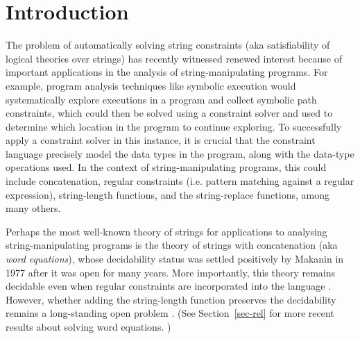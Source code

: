 
\section{Introduction}
\label{sec:intro}

The problem of %
automatically solving string constraints (aka satisfiability of logical theories over
strings) has recently witnessed renewed interest %
\cite{Berkeley-JavaScript,TCJ16,LB16,YABI14,S3,Abdulla14,Abdulla17,DV13,symbolic-transducer,BEK} 
because of important applications in the analysis of string-manipulating programs. For example,
program analysis techniques like symbolic execution \cite{king76,DART,EXE} 
would
systematically explore executions in a program and collect symbolic path 
constraints, which could then be solved using a constraint solver and
used to determine which location in the program to continue exploring.
To successfully apply a constraint solver in this instance, it is
crucial that the constraint language precisely model the data types in the
program, along with the data-type operations used. In the context of
string-manipulating programs, this could include 
concatenation, regular constraints (i.e. pattern matching against a regular
expression), string-length functions, and the string-replace functions, among 
many others.

Perhaps the most well-known theory of strings for applications to analysing string-manipulating programs is the theory of strings with concatenation  (aka \emph{word equations}), whose decidability status was settled positively by Makanin \cite{Makanin} in 1977 after it was open for many years. More importantly, 
this theory remains decidable even when regular constraints are incorporated into the 
language \cite{Schulz}. However, whether adding the string-length function
 preserves the decidability remains a long-standing open problem
\cite{Vijay-length,buchi}. (See Section~\ref{sec-rel} for more recent results about solving word equations. )

